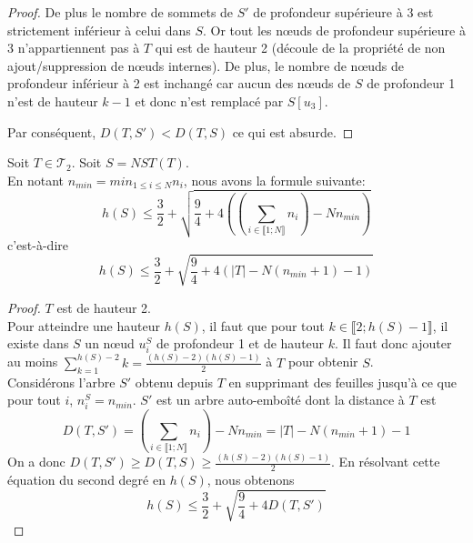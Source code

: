 \begin{lem}
\begin{proof}
    De plus le nombre de sommets de $S'$ de profondeur supérieure à 3
    est strictement inférieur à celui dans $S$. Or tout les nœuds de
    profondeur supérieure à 3 n'appartiennent pas à $T$ qui est de
    hauteur 2 (découle de la propriété de non ajout/suppression de
    nœuds internes). De plus, le nombre de nœuds de profondeur
    inférieur à 2 est inchangé car aucun des nœuds de $S$ de profondeur 1
    n'est de hauteur $k - 1$ et donc n'est remplacé par $S[u_{3}]$.

    Par conséquent, $D(T,S') < D(T,S)$ ce qui est absurde.
  
  \end{proof}
\end{lem}

\begin{prop}
  \label{prop1}
  Soit $T \in \mathcal{T}_{2}$. Soit $S = NST(T)$. \\
  En notant $n_{min} = min_{1 \leqslant i \leqslant N} n_{i}$,
  nous avons la formule suivante:
  $$h(S) \leqslant \frac{3}{2} +\sqrt{\frac{9}{4} + 4 \left( \left(\sum_{i \in
          \llbracket 1;N \rrbracket}n_{i} \right) - N n_{min} \right)} $$ 
  c'est-à-dire
  $$h(S) \leqslant \frac{3}{2} +\sqrt{\frac{9}{4} + 4 \left( |T| - N
      (n_{min} + 1) -1 \right)} $$  
  \begin{proof}
    $T$ est de hauteur 2. \\
    Pour atteindre une hauteur $h(S)$, il faut que pour tout
    $k \in \llbracket 2;h(S)-1 \rrbracket$, il existe dans $S$ un nœud
    $u_{i}^{S}$ de profondeur 1 et de hauteur $k$.  Il faut donc
    ajouter au moins $\sum_{k=1}^{h(S) - 2}k =
    \frac{(h(S) -2)(h(S)-1)}{2}$ à $T$ pour obtenir $S$.\\
    Considérons l'arbre $S'$ obtenu depuis $T$ en supprimant des
    feuilles jusqu'à ce que pour tout $i$, $n_{i}^{S} = n_{min}$. $S'$ est
    un arbre auto-emboîté dont la distance à $T$ est
    $$D(T,S') = \left(\sum_{i \in \llbracket 1;N \rrbracket}n_{i} \right) - N n_{min} = |T| - N (n_{min} + 1) - 1$$
    On a donc
    $D(T,S') \geqslant D(T,S) \geqslant \frac{(h(S)
      -2)(h(S)-1)}{2}$.
    En résolvant cette équation du second degré en $h(S)$, nous obtenons
    $$h(S) \leqslant \frac{3}{2} +\sqrt{\frac{9}{4} + 4 D(T,S')}$$
  \end{proof}
\end{prop}

